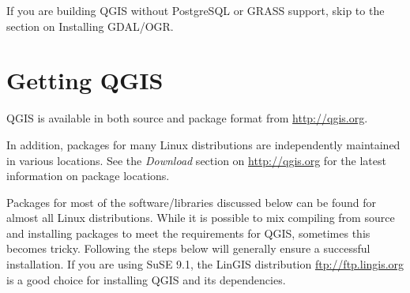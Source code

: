 If you are building QGIS without PostgreSQL or GRASS support, skip to the section on Installing GDAL/OGR. 
\section{Getting QGIS}
QGIS is available in both source and package format from \url{http://qgis.org}. 

In addition, packages for many Linux distributions are independently maintained in various locations. See 
the \textit{Download} section on \url{http://qgis.org} for the latest information on package locations.

Packages for most of the software/libraries discussed below can be found for almost all Linux distributions. While it is possible to mix compiling from source and installing packages to meet the requirements for QGIS, sometimes this becomes tricky. Following the steps below will generally ensure a successful installation. If you are using SuSE 9.1, the LinGIS distribution \url{ftp://ftp.lingis.org} is a good choice for installing QGIS and its dependencies.


